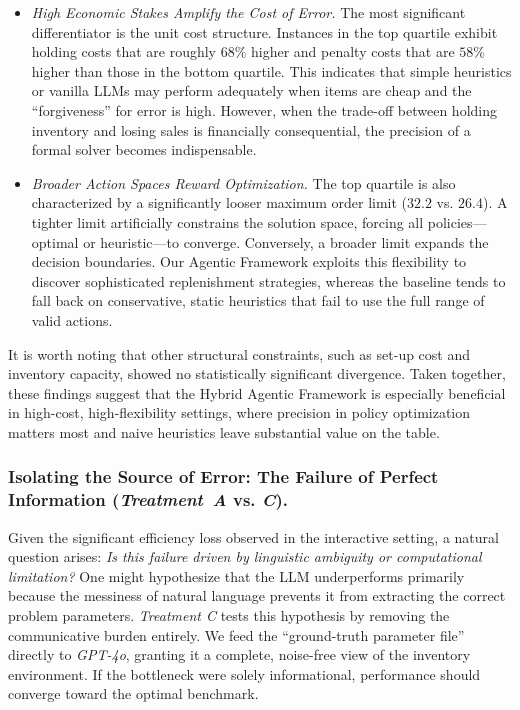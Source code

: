 \begin{itemize}
    \item \emph{High Economic Stakes Amplify the Cost of Error.} 
    The most significant differentiator is the unit cost structure. Instances in the top quartile exhibit holding costs that are roughly $68\%$ higher and penalty costs that are $58\%$ higher than those in the bottom quartile. This indicates that simple heuristics or vanilla LLMs may perform adequately when items are cheap and the ``forgiveness'' for error is high. However, when the trade-off between holding inventory and losing sales is financially consequential, the precision of a formal solver becomes indispensable.
    
    \item \emph{Broader Action Spaces Reward Optimization.} 
    The top quartile is also characterized by a significantly looser maximum order limit ($32.2$ vs. $26.4$). A tighter limit artificially constrains the solution space, forcing all policies—optimal or heuristic—to converge. Conversely, a broader limit expands the decision boundaries. Our Agentic Framework exploits this flexibility to discover sophisticated replenishment strategies, whereas the baseline tends to fall back on conservative, static heuristics that fail to use the full range of valid actions.
\end{itemize}

It is worth noting that other structural constraints, such as set-up cost and inventory capacity, showed no statistically significant divergence. Taken together, these findings suggest that the Hybrid Agentic Framework is especially beneficial in high-cost, high-flexibility settings, where precision in policy optimization matters most and naive heuristics leave substantial value on the table.





\subsubsection{Isolating the Source of Error: The Failure of Perfect Information (\mbox{\emph{Treatment A}} vs. \emph{C}).}
\label{sec:cognitive_ceiling}

Given the significant efficiency loss observed in the interactive setting, a natural question arises: \emph{Is this failure driven by linguistic ambiguity or computational limitation?} One might hypothesize that the LLM underperforms primarily because the messiness of natural language prevents it from extracting the correct problem parameters.
\emph{Treatment C} tests this hypothesis by removing the communicative burden entirely. We feed the ``ground-truth parameter file'' directly to \emph{GPT-4o}, granting it a complete, noise-free view of the inventory environment. If the bottleneck were solely informational, performance should converge toward the optimal benchmark.
\vspace{-1em}

